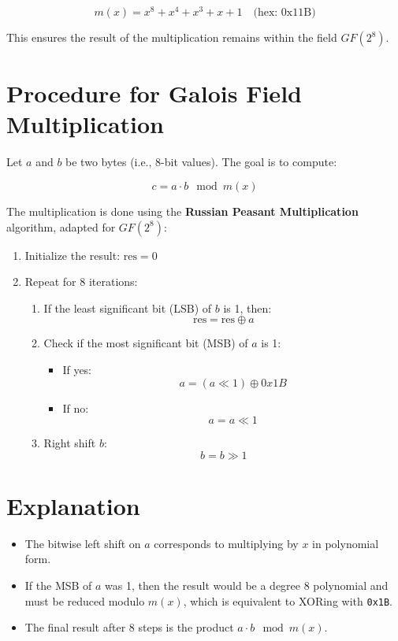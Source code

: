 \documentclass[12pt,a4paper]{report}
\begin{document}
\[
m(x) = x^8 + x^4 + x^3 + x + 1 \quad \text{(hex: 0x11B)}
\]

This ensures the result of the multiplication remains within the field \( GF(2^8) \).

\section*{Procedure for Galois Field Multiplication}

Let \( a \) and \( b \) be two bytes (i.e., 8-bit values). The goal is to compute:

\[
c = a \cdot b \mod m(x)
\]

The multiplication is done using the \textbf{Russian Peasant Multiplication} algorithm, adapted for \( GF(2^8) \):

\begin{enumerate}
    \item Initialize the result: \( \text{res} = 0 \)
    \item Repeat for 8 iterations:
    \begin{enumerate}
        \item If the least significant bit (LSB) of \( b \) is 1, then:
        \[
        \text{res} = \text{res} \oplus a
        \]
        \item Check if the most significant bit (MSB) of \( a \) is 1:
        \begin{itemize}
            \item If yes: 
            \[
            a = (a \ll 1) \oplus 0x1B
            \]
            \item If no: 
            \[
            a = a \ll 1
            \]
        \end{itemize}
        \item Right shift \( b \): 
        \[
        b = b \gg 1
        \]
    \end{enumerate}
\end{enumerate}

\section*{Explanation}

\begin{itemize}
    \item The bitwise left shift on \( a \) corresponds to multiplying by \( x \) in polynomial form.
    \item If the MSB of \( a \) was 1, then the result would be a degree 8 polynomial and must be reduced modulo \( m(x) \), which is equivalent to XORing with \texttt{0x1B}.
    \item The final result after 8 steps is the product \( a \cdot b \mod m(x) \).
\end{itemize}
\end{document}

